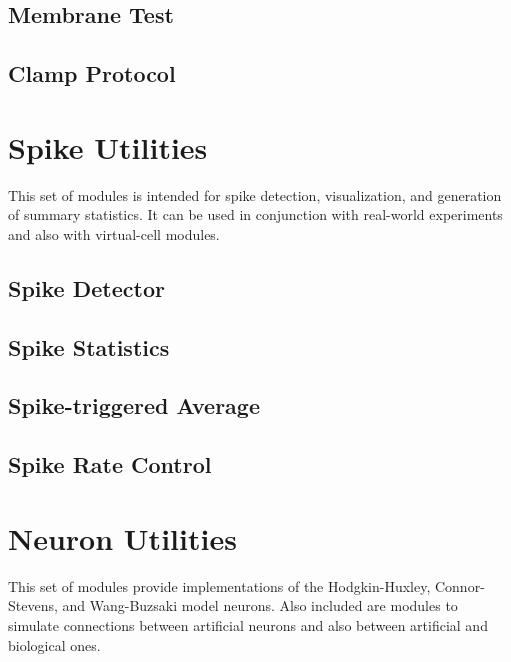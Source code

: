 \subsection{Membrane Test}


\subsection{Clamp Protocol}


\clearpage
\section{Spike Utilities} 
\label{spikeutilities}
This set of modules is intended for spike detection, visualization, and generation of summary statistics.  It can be used in conjunction with real-world experiments and also with virtual-cell modules. 

\subsection{Spike Detector}


\subsection{Spike Statistics}


\subsection{Spike-triggered Average}


\subsection{Spike Rate Control}


\clearpage
\section{Neuron Utilities}
\label{neuronutilties}
This set of modules provide implementations of the Hodgkin-Huxley, Connor-Stevens, and Wang-Buzsaki model neurons. Also included are modules to simulate connections between artificial neurons and also between artificial and biological ones. 

